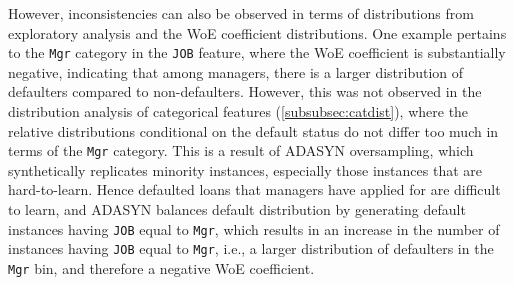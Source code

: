         However, inconsistencies can also be observed in terms of distributions from exploratory analysis and the WoE coefficient distributions.
        One example pertains to the \texttt{Mgr} category in the \texttt{JOB} feature, where the WoE coefficient is substantially negative, indicating that among managers, there is a larger distribution of defaulters compared to non-defaulters.
        However, this was not observed in the distribution analysis of categorical features (\autoref{subsubsec:catdist}), where the relative distributions conditional on the default status do not differ too much in terms of the \texttt{Mgr} category.
        This is a result of ADASYN oversampling, which synthetically replicates minority instances, especially those instances that are hard-to-learn.
        Hence defaulted loans that managers have applied for are difficult to learn, and ADASYN balances default distribution by generating default instances having \texttt{JOB} equal to \texttt{Mgr}, which results in an increase in the number of instances having \texttt{JOB} equal to \texttt{Mgr}, i.e., a larger distribution of defaulters in the \texttt{Mgr} bin, and therefore a negative WoE coefficient.
        
